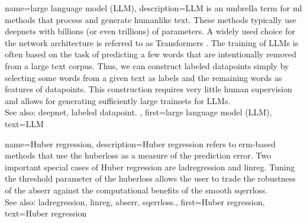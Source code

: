 {name={large language model (LLM)},
	description={LLM is an umbrella term for \gls{ml} methods 
		that process and generate humanlike text. These methods typically 
		use \glspl{deepnet} with billions (or even trillions) of \glspl{parameter}. 
		A widely used choice for the network architecture is referred to as 
		Transformers \cite{vaswani2017attention}. The training of LLMs is often  
		based on the task of predicting a few words that are intentionally removed 
		from a large text corpus. Thus, we can construct \glspl{labeled datapoint} 
		simply by selecting some words from a given text as \glspl{label} and the remaining 
		words as \glspl{feature} of \glspl{datapoint}. This construction requires 
		very little human supervision and allows for generating sufficiently 
		large \glspl{trainset} for LLMs.
			\\
		See also: \gls{deepnet}, \gls{labeled datapoint}. },
	first={large language model (LLM)},
	text={LLM}
}


{name={Huber regression},
	description={Huber \gls{regression} refers to \gls{erm}-based methods 
		that use the \gls{huberloss} as a measure of the \gls{prediction} error. 
		Two important special cases of Huber \gls{regression} are \gls{ladregression} and 
		\gls{linreg}. Tuning the threshold \gls{parameter} of the \gls{huberloss} allows the user
		to trade the \gls{robustness} of the \gls{abserr} 
		against the computational benefits of the \gls{smooth} \gls{sqerrloss}.
					\\
		See also: \gls{ladregression}, \gls{linreg}, \gls{abserr}, \gls{sqerrloss}.},
	first={Huber regression},
	text={Huber regression}
}


